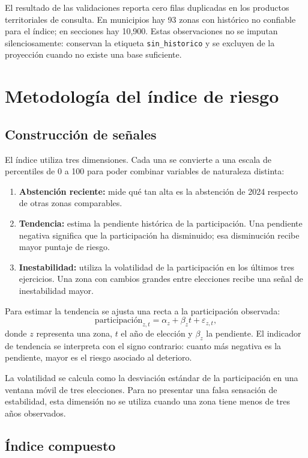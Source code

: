 \documentclass[11pt,a4paper]{article}
\begin{document}
El resultado de las validaciones reporta cero filas duplicadas en los productos territoriales de consulta. En municipios hay 93 zonas con histórico no confiable para el índice; en secciones hay 10,900. Estas observaciones no se imputan silenciosamente: conservan la etiqueta \texttt{sin\_historico} y se excluyen de la proyección cuando no existe una base suficiente.

\section{Metodología del índice de riesgo}

\subsection{Construcción de señales}

El índice utiliza tres dimensiones. Cada una se convierte a una escala de percentiles de 0 a 100 para poder combinar variables de naturaleza distinta:

\begin{enumerate}
    \item \textbf{Abstención reciente:} mide qué tan alta es la abstención de 2024 respecto de otras zonas comparables.
    \item \textbf{Tendencia:} estima la pendiente histórica de la participación. Una pendiente negativa significa que la participación ha disminuido; esa disminución recibe mayor puntaje de riesgo.
    \item \textbf{Inestabilidad:} utiliza la volatilidad de la participación en los últimos tres ejercicios. Una zona con cambios grandes entre elecciones recibe una señal de inestabilidad mayor.
\end{enumerate}

Para estimar la tendencia se ajusta una recta a la participación observada:
\[
\text{participación}_{z,t} = \alpha_z + \beta_z t + \varepsilon_{z,t},
\]
donde $z$ representa una zona, $t$ el año de elección y $\beta_z$ la pendiente. El indicador de tendencia se interpreta con el signo contrario: cuanto más negativa es la pendiente, mayor es el riesgo asociado al deterioro.

La volatilidad se calcula como la desviación estándar de la participación en una ventana móvil de tres elecciones. Para no presentar una falsa sensación de estabilidad, esta dimensión no se utiliza cuando una zona tiene menos de tres años observados.

\subsection{Índice compuesto}
\end{document}
